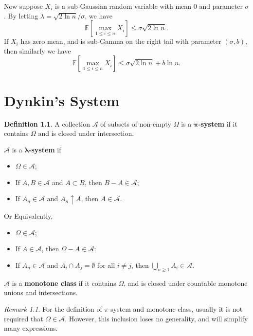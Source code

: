 \documentclass[openany]{book}
\theoremstyle{definition}
\newtheorem{definition}{Definition}[chapter]
\theoremstyle{remark}
\newtheorem*{remark}{Remark}
\begin{document}
Now suppose $X_i$ is a sub-Gaussian random variable with mean $0$ and parameter $\sigma$. By letting $\lambda=\sqrt{2\ln n}/\sigma$, we have
\begin{equation*}
    \mathbb{E}\left[\max_{1\le i\le n}X_i\right]\le\sigma\sqrt{2\ln n}.
\end{equation*}
If $X_i$ has zero mean, and is sub-Gamma on the right tail with parameter $(\sigma,b)$, then similarly we have
\begin{equation*}
    \mathbb{E}\left[\max_{1\le i\le n}X_i\right]\le\sigma\sqrt{2\ln n}+b\ln n.
\end{equation*}




\appendix

\chapter{Dynkin's System}\label{chpApp:piLambda}
\begin{definition}
    A collection $\mathcal{A}$ of subsets of non-empty $\Omega$ is a $\boldsymbol{\pi}$\textbf{-system} if it contains $\Omega$ and is closed under intersection.

    $\mathcal{A}$ is a $\boldsymbol{\lambda}$\textbf{-system} if
    \begin{itemize}
        \item $\Omega\in \mathcal{A}$;
        \item If $A,B\in \mathcal{A}$ and $A\subset B$, then $B-A\in \mathcal{A}$;
        \item If $A_n\in \mathcal{A}$ and $A_n\uparrow A$, then $A\in \mathcal{A}$.
    \end{itemize}
    Or Equivalently,
    \begin{itemize}
        \item $\Omega\in \mathcal{A}$;
        \item If $A\in \mathcal{A}$, then $\Omega-A\in \mathcal{A}$;
        \item If $A_n\in \mathcal{A}$ and $A_i\cap A_j=\emptyset$ for all $i\ne j$, then $\bigcup_{n\ge1}A_i\in \mathcal{A}$.
    \end{itemize}

    $\mathcal{A}$ is a \textbf{monotone class} if it contains $\Omega$, and is closed under countable monotone unions and intersections.
\end{definition}
\begin{remark}
    For the definition of $\pi$-system and monotone class, usually it is not required that $\Omega\in \mathcal{A}$. However, this inclusion loses no generality, and will simplify many expressions.
\end{remark}
\end{document}
